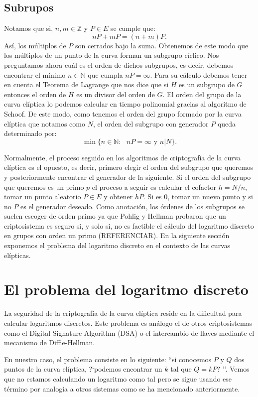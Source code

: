 \documentclass[11pt]{article}
\begin{document}
\subsection{Subrupos}
Notamos que si, $ n, m \in \mathbb{Z} $ y $ P \in E $ se cumple que:
\[
nP + mP = (n+m)P.
\]
Así, los múltiplos de $ P $ son cerrados bajo la suma. Obtenemos de este modo que los múltiplos de un punto de la curva forman un subgrupo cíclico. Nos preguntamos ahora cuál es el orden de dichos subgrupos, es decir, debemos encontrar el mínimo $ n \in \mathbb{N} $ que cumpla $ nP = \infty $. Para su cálculo debemos tener en cuenta el Teorema de Lagrange que nos dice que si $ H $ es un subgrupo de $ G $ entonces el orden de $ H $ es un divisor del orden de $ G $. El orden del grupo de la curva elíptica lo podemos calcular en tiempo polinomial gracias al algoritmo de Schoof. De este modo, como tenemos el orden del grupo formado por la curva elíptica que notamos como $ N $, el orden del subgrupo con generador $ P $ queda determinado por:
\[
\min\{ n \in \mathbb{N}:\text{ } nP = \infty \text{ y } n | N\}.
\]

Normalmente, el proceso seguido en los algoritmos de criptografía de la curva elíptica es el opuesto, es decir, primero elegir el orden del subgrupo que queremos y posteriormente encontrar el generador de la siguiente. Si el orden del subgrupo que queremos es un primo $ p $ el proceso a seguir es calcular el cofactor $ h = N/n $, tomar un punto aleatorio $ P \in E $ y obtener $ hP $. Si es 0, tomar un nuevo punto y si no $ P $ es el generador deseado. Como anotación, los órdenes de los subgrupos se suelen escoger de orden primo ya que Pohlig y Hellman probaron que un criptosistema es seguro si, y solo si, no es factible el cálculo del logaritmo discreto en grupos con orden un primo (REFERENCIAR). En la siguiente sección exponemos el problema del logaritmo discreto en el contexto de las curvas elípticas. \\
\section{El problema del logaritmo discreto}
\label{sec:log}
La seguridad de la criptografía de la curva elíptica reside en la dificultad para calcular logaritmos discretos. Este problema es análogo el de otros criptosistemas como el Digital Signature Algorithm (DSA) o el intercambio de llaves mediante el mecanismo de Diffie-Hellman.

En nuestro caso, el problema consiste en lo siguiente: ``si conocemos $ P $ y $ Q $ dos puntos de la curva elíptica, ?`podemos encontrar un $ k $ tal que $ Q = kP $? ''. Vemos que no estamos calculando un logaritmo como tal pero se sigue usando ese término por analogía a otros sistemas como se ha mencionado anteriormente. 
\end{document}
